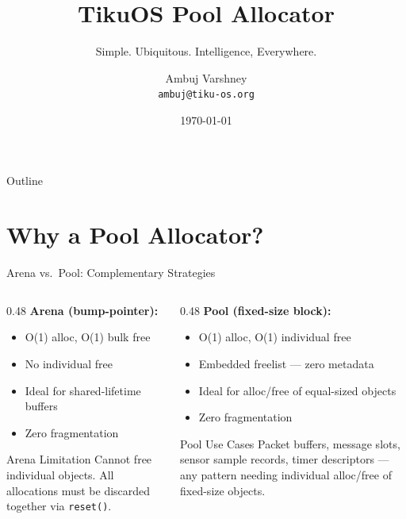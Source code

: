 \documentclass[aspectratio=169, 10pt]{beamer}
\title[TikuOS Pool]{TikuOS Pool Allocator}
\subtitle{Simple. Ubiquitous. Intelligence, Everywhere.}
\author[Ambuj Varshney]{Ambuj Varshney \\ \texttt{ambuj@tiku-os.org}}
\date{\today}
\begin{document}
\begin{frame}
\titlepage
\end{frame}

\begin{frame}{Outline}
\tableofcontents
\end{frame}

\section{Why a Pool Allocator?}

\begin{frame}{Arena vs.\ Pool: Complementary Strategies}
\begin{columns}[T]
\begin{column}{0.48\textwidth}
\textbf{Arena (bump-pointer):}
\begin{itemize}
  \item O(1) alloc, O(1) bulk free
  \item No individual free
  \item Ideal for shared-lifetime buffers
  \item Zero fragmentation
\end{itemize}

\vspace{0.5em}
\begin{block}{Arena Limitation}
Cannot free individual objects. All allocations must be
discarded together via \texttt{reset()}.
\end{block}
\end{column}

\begin{column}{0.48\textwidth}
\textbf{Pool (fixed-size block):}
\begin{itemize}
  \item O(1) alloc, O(1) individual free
  \item Embedded freelist --- zero metadata
  \item Ideal for alloc/free of equal-sized objects
  \item Zero fragmentation
\end{itemize}

\vspace{0.5em}
\begin{block}{Pool Use Cases}
Packet buffers, message slots, sensor sample records,
timer descriptors --- any pattern needing individual
alloc/free of fixed-size objects.
\end{block}
\end{column}
\end{columns}
\end{frame}
\end{document}
